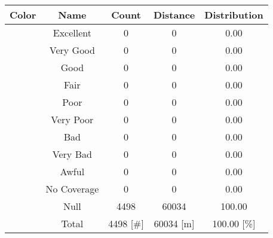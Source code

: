 \begin{tabular}{|c|c|c|c|c|}\hline
\rowcolor{Plum!20}
Color&Name&Count&Distance&Distribution\\\hline\hline
\cellcolor[HTML]{00703c} &Excellent&0&0&0.00\\\hline
\cellcolor[HTML]{00a032} &Very Good&0&0&0.00\\\hline
\cellcolor[HTML]{00d228} &Good&0&0&0.00\\\hline
\cellcolor[HTML]{ffff00} &Fair&0&0&0.00\\\hline
\cellcolor[HTML]{ffaa00} &Poor&0&0&0.00\\\hline
\cellcolor[HTML]{fa6400} &Very Poor&0&0&0.00\\\hline
\cellcolor[HTML]{ff0000} &Bad&0&0&0.00\\\hline
\cellcolor[HTML]{dc143c} &Very Bad&0&0&0.00\\\hline
\cellcolor[HTML]{820000} &Awful&0&0&0.00\\\hline
\cellcolor[HTML]{aaaaaa} &No Coverage&0&0&0.00\\\hline
\cellcolor[HTML]{000000} &Null&4498&60034&100.00\\\hline
\cellcolor[HTML]{ffffff} &Total&4498 [\#]&60034 [m]&100.00 [\%]\\\hline
\end{tabular}
